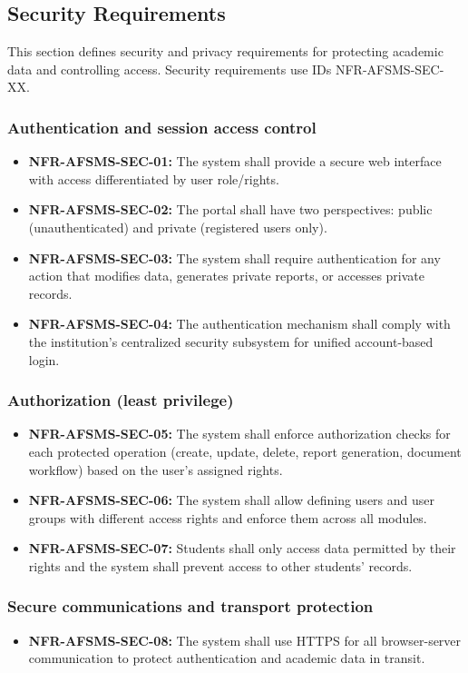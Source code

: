 \documentclass[11pt, a4paper]{article}
\begin{document}
\subsection{Security Requirements}
This section defines security and privacy requirements for protecting academic data and controlling access. Security requirements use IDs NFR-AFSMS-SEC-XX.

\subsubsection{Authentication and session access control}
\begin{itemize}
    \item \textbf{NFR-AFSMS-SEC-01:} The system shall provide a secure web interface with access differentiated by user role/rights.
    \item \textbf{NFR-AFSMS-SEC-02:} The portal shall have two perspectives: public (unauthenticated) and private (registered users only).
    \item \textbf{NFR-AFSMS-SEC-03:} The system shall require authentication for any action that modifies data, generates private reports, or accesses private records.
    \item \textbf{NFR-AFSMS-SEC-04:} The authentication mechanism shall comply with the institution's centralized security subsystem for unified account-based login.
\end{itemize}

\subsubsection{Authorization (least privilege)}
\begin{itemize}
    \item \textbf{NFR-AFSMS-SEC-05:} The system shall enforce authorization checks for each protected operation (create, update, delete, report generation, document workflow) based on the user's assigned rights.
    \item \textbf{NFR-AFSMS-SEC-06:} The system shall allow defining users and user groups with different access rights and enforce them across all modules.
    \item \textbf{NFR-AFSMS-SEC-07:} Students shall only access data permitted by their rights and the system shall prevent access to other students' records.
\end{itemize}

\subsubsection{Secure communications and transport protection}
\begin{itemize}
    \item \textbf{NFR-AFSMS-SEC-08:} The system shall use HTTPS for all browser-server communication to protect authentication and academic data in transit.
\end{itemize}
\end{document}
